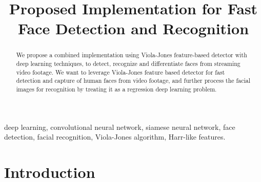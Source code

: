 \documentclass[conference]{IEEEtran}
\begin{document}
\title{Proposed Implementation for Fast Face Detection and Recognition \\
}

\author{
\and
{}
\and
{}

}

\maketitle

\begin{abstract}

We propose a combined implementation using Viola-Jones feature-based detector with deep learning techniques, to detect, recognize and differentiate faces from streaming video footage. We want to leverage Viola-Jones feature based detector for fast detection and capture of human faces from video footage, and further process the facial images for recognition by treating it as a regression deep learning problem. 

\end{abstract}

\begin{IEEEkeywords}
deep learning, convolutional neural network, siamese neural network, face detection, facial recognition, Viola-Jones algorithm, Harr-like features.
\end{IEEEkeywords}

\section{Introduction}
\end{document}
